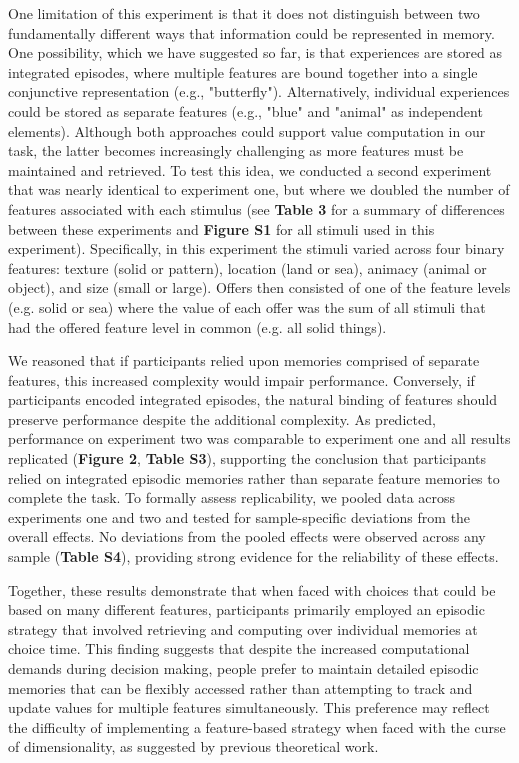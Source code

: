 \documentclass[10pt,letterpaper]{article}
\begin{document}
One limitation of this experiment is that it does not distinguish between two fundamentally different ways that information could be represented in memory. One possibility, which we have suggested so far, is that experiences are stored as integrated episodes, where multiple features are bound together into a single conjunctive representation (e.g., "butterfly")\cite{oreillyHippocampalConjunctiveEncoding1994, oreillyConjunctiveRepresentationsLearning}. Alternatively, individual experiences could be stored as separate features (e.g., "blue" and "animal" as independent elements)\cite{rudyConjunctiveRepresentationsHippocampus2001}. Although both approaches could support value computation in our task, the latter becomes increasingly challenging as more features must be maintained and retrieved. To test this idea, we conducted a second experiment that was nearly identical to experiment one, but where we doubled the number of features associated with each stimulus (see \textbf{Table 3} for a summary of differences between these experiments and \textbf{Figure S1} for all stimuli used in this experiment). Specifically, in this experiment the stimuli varied across four binary features: texture (solid or pattern), location (land or sea), animacy (animal or object), and size (small or large). Offers then consisted of one of the feature levels (e.g. solid or sea) where the value of each offer was the sum of all stimuli that had the offered feature level in common (e.g. all solid things).

We reasoned that if participants relied upon memories comprised of separate features, this increased complexity would impair performance. Conversely, if participants encoded integrated episodes, the natural binding of features should preserve performance despite the additional complexity. As predicted, performance on experiment two was comparable to experiment one and all results replicated (\textbf{Figure 2}, \textbf{Table S3}), supporting the conclusion that participants relied on integrated episodic memories rather than separate feature memories to complete the task. To formally assess replicability, we pooled data across experiments one and two and tested for sample-specific deviations from the overall effects. No deviations from the pooled effects were observed across any sample (\textbf{Table S4}), providing strong evidence for the reliability of these effects.

Together, these results demonstrate that when faced with choices that could be based on many different features, participants primarily employed an episodic strategy that involved retrieving and computing over individual memories at choice time. This finding suggests that despite the increased computational demands during decision making, people prefer to maintain detailed episodic memories that can be flexibly accessed rather than attempting to track and update values for multiple features simultaneously. This preference may reflect the difficulty of implementing a feature-based strategy when faced with the curse of dimensionality, as suggested by previous theoretical work\cite{gershmanReinforcementLearningEpisodic2017}.
\end{document}
